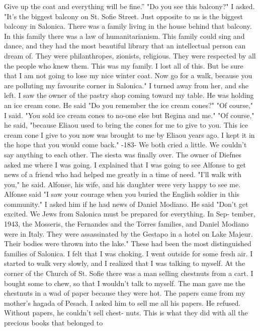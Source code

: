 Give up the coat and everything will be fine.”
"Do you see this balcony?"
I asked.
"It's the biggest balcony on 
St.
Sofie Street.
Just opposite to us is the biggest balcony in Salonica.
There was a family living in the house behind that balcony.
In this
family there was a law of humanitarianism.
This family could sing and 
dance, and they had the most beautiful library that an intellectual person can dream of.
They were philanthropes, zionists, religious.
They 
were respected by all the people who knew them.
This was my family.
I 
lost all of this.
But be sure that I am not going to lose my nice winter coat.
Now go for a walk, because you are polluting my favourite corner in Salonica."
I turned away from her, and she left.
I saw the owner of the pastry shop coming toward my table.
He was 
holding an ice cream cone.
He said "Do you remember the ice cream 
cones?"
"Of course," I said.
"You sold ice cream cones to no-one else but 
Regina and me."
"Of course," he said, "because Eliaou used to bring the cones for me 
to give to you.
This ice cream cone I give to you now was brought to me 
by Eliaou years ago.
I kept it in the hope that you would come back."
-183- 
We both cried a little.
We couldn't say anything to each other.
The siesta was finally over.
The owner of Diefnes asked me where I 
was going.
I explained that I was going to see Alfonse to get news of a 
friend who had helped me greatly in a time of need.
"I'll walk with you," he said.
Alfonse, his wife, and his daughter were very happy to see me.
Alfonse said "I saw your courage when you buried the English soldier in 
this community."
I asked him if he had news of Daniel Modiano.
He said "Don't get 
excited.
We Jews from Salonica must be prepared for everything.
In Sep-
tember, 1943, the Mosseris, the Fernandes and the Torres families, and 
Daniel Modiano were in Italy.
They were assassinated by the Gestapo in 
a hotel on Lake Majeur.
Their bodies were thrown into the lake."
These had been the most distinguished families of Salonica.
I felt 
that I was choking.
I went outside for some fresh air.
I started to 
walk very slowly, and I realized that I was talking to myself.
At the 
corner of the Church of St.
Sofie there was a man selling chestnuts from 
a cart.
I bought some to chew, so that I wouldn't talk to myself.
The man gave me the chestnuts in a wad of paper because they were hot.
The papers came from my mother's hagada of Pesach.
I asked him to sell 
me all his papers.
He refused.
Without papers, he couldn't sell chest-
nuts.
This is what they did with all the precious books that belonged to 
